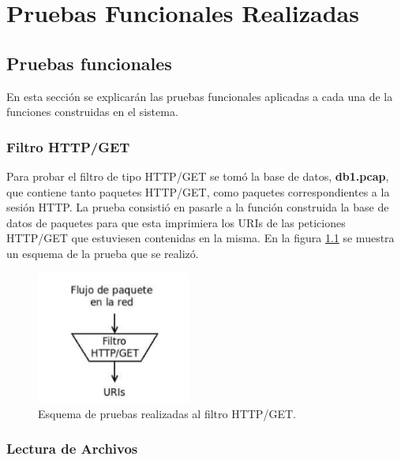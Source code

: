 \chapter{Pruebas Funcionales Realizadas}
\label{apendiceB}

\section*{Pruebas funcionales}

En esta sección se explicarán las pruebas funcionales aplicadas a cada
una de la funciones construidas en el sistema.

\subsection*{Filtro HTTP/GET}

Para probar el filtro de tipo HTTP/GET se tomó la base de datos,
\textbf{db1.pcap}, que contiene tanto paquetes HTTP/GET, como paquetes correspondientes a la sesión HTTP. La prueba consistió en pasarle a la función construida la base de datos de paquetes para que esta imprimiera los URIs de las peticiones HTTP/GET que estuviesen contenidas en la misma. En la
figura \ref{fig:filtroHTTP} se muestra un esquema de la prueba que se realizó.

\begin{figure}[!htb]
\begin{center}
\includegraphics[width=2in]{./img/filtroHTTP.png}
\caption{Esquema de pruebas realizadas al filtro HTTP/GET.}
\label{fig:filtroHTTP}
\end{center}
\end{figure}

\subsection*{Lectura de Archivos}

